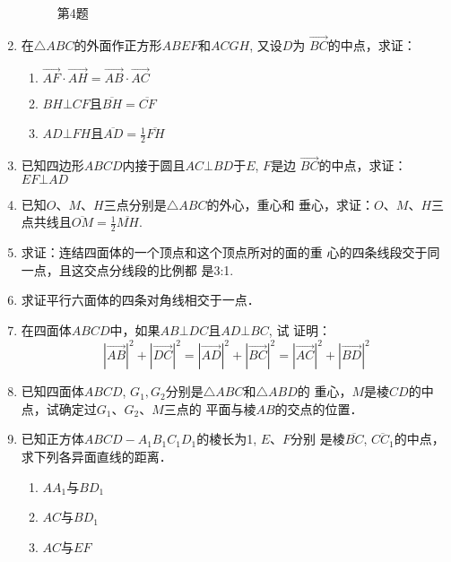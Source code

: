 \begin{enumerate}
\begin{figure}[htp]
    \caption*{第4题}
\end{figure}


\item 在$\triangle ABC$的外面作正方形$ABEF$和$ACGH$, 又设$D$为
$\Vec{BC}$的中点，求证：
\begin{enumerate}
    \item $\Vec{AF}\cdot \Vec{AH}=\Vec{AB}\cdot \Vec{AC}$
    \item $BH\bot CF$且$\overline{BH}=\overline{CF}$
    \item $AD\bot FH$且$\overline{AD}=\frac{1}{2} \overline{FH}$
\end{enumerate}

\item 已知四边形$ABCD$内接于圆且$AC\bot BD$于$E$, $F$是边
$\Vec{BC}$的中点，求证：$EF\bot AD$
\item 已知$O$、$M$、$H$三点分别是$\triangle ABC$的外心，重心和
垂心，求证：$O$、$M$、$H$三点共线且$\overline{OM}=\frac{1}{2}\overline{MH}$.
\item 求证：连结四面体的一个顶点和这个顶点所对的面的重
心的四条线段交于同一点，且这交点分线段的比例都
是3:1.
\item 求证平行六面体的四条对角线相交于一点．
\item 在四面体$ABCD$中，如果$AB\bot DC$且$AD\bot BC$, 试
证明：
\[|\Vec{AB}|^2+|\Vec{DC}|^2=|\Vec{AD}|^2+|\Vec{BC}|^2=|\Vec{AC}|^2+|\Vec{BD}|^2\]
\item 已知四面体$ABCD$, $G_1,G_2$分别是$\triangle ABC$和$\triangle ABD$的
重心，$M$是棱$CD$的中点，试确定过$G_1$、$G_2$、$M$三点的
平面与棱$AB$的交点的位置．
\item 已知正方体$ABCD-A_1B_1C_1D_1$的棱长为1, $E$、$F$分别
是棱$\overline{BC}$, $\overline{CC_1}$的中点，求下列各异面直线的距离．
\begin{multicols}{3}
    \begin{enumerate}
        \item $AA_1$与$BD_1$
        \item $AC$与$BD_1$
        \item $AC$与$EF$
    \end{enumerate}
\end{multicols}
\end{enumerate}